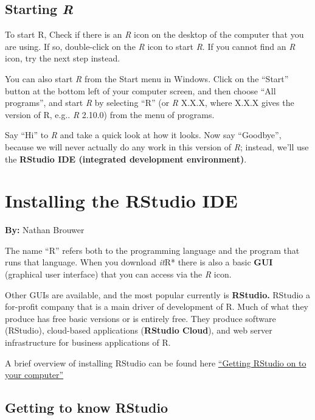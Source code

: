 \documentclass[
]{book}
\begin{document}
\hypertarget{starting-r}{%
\section{\texorpdfstring{Starting \emph{R}}{Starting R}}\label{starting-r}}

To start R, Check if there is an \emph{R} icon on the desktop of the computer that you are using. If so, double-click on the \emph{R} icon to start \emph{R}. If you cannot find an \emph{R} icon, try the next step instead.

You can also start \emph{R} from the Start menu in Windows. Click on the ``Start'' button at the bottom left of your computer screen, and then choose ``All programs'', and start \emph{R} by selecting ``R'' (or \emph{R} X.X.X, where X.X.X gives the version of R, e.g.. \emph{R} 2.10.0) from the menu of programs.

Say ``Hi'' to \emph{R} and take a quick look at how it looks. Now say ``Goodbye'', because we will never actually do any work in this version of \emph{R}; instead, we'll use the \textbf{RStudio IDE (integrated development environment)}.

\hypertarget{installing-the-rstudio-ide}{%
\chapter{Installing the RStudio IDE}\label{installing-the-rstudio-ide}}

\textbf{By:} Nathan Brouwer

The name ``R'' refers both to the programming language and the program that runs that language. When you download \emph{it}R* there is also a basic \textbf{GUI} (graphical user interface) that you can access via the \emph{R} icon.

Other GUIs are available, and the most popular currently is \textbf{RStudio.} RStudio a for-profit company that is a main driver of development of R. Much of what they produce has free basic versions or is entirely free. They produce software (RStudio), cloud-based applications (\textbf{RStudio Cloud}), and web server infrastructure for business applications of R.

A brief overview of installing RStudio can be found here \href{https://brouwern.github.io/BOOK_R_Ecological_Data_Science/getting-rstudio-on-to-your-computer.html}{``Getting RStudio on to your computer''}

\hypertarget{getting-to-know-rstudio}{%
\section{Getting to know RStudio}\label{getting-to-know-rstudio}}
\end{document}

